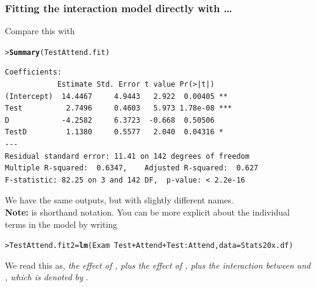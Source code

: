 \documentclass{beamer}\usepackage[]{graphicx}\usepackage[]{xcolor}
\makeatletter
\newcommand{\hlopt}[1]{\textcolor[rgb]{0,0,0}{#1}}%
\newcommand{\hlstd}[1]{\textcolor[rgb]{0.345,0.345,0.345}{#1}}%
\newcommand{\hlkwb}[1]{\textcolor[rgb]{0.69,0.353,0.396}{#1}}%
\newcommand{\hlkwc}[1]{\textcolor[rgb]{0.333,0.667,0.333}{#1}}%
\newcommand{\hlkwd}[1]{\textcolor[rgb]{0.737,0.353,0.396}{\textbf{#1}}}%
\newenvironment{kframe}{%
 \def\at@end@of@kframe{}%
 \ifinner\ifhmode%
  \def\at@end@of@kframe{\end{minipage}}%
  \begin{minipage}{\columnwidth}%
 \fi\fi%
 \def\FrameCommand##1{\hskip\@totalleftmargin \hskip-\fboxsep
 \colorbox{shadecolor}{##1}\hskip-\fboxsep
     \hskip-\linewidth \hskip-\@totalleftmargin \hskip\columnwidth}%
 \MakeFramed {\advance\hsize-\width
   \@totalleftmargin\z@ \linewidth\hsize
   \@setminipage}}%
 {\par\unskip\endMakeFramed%
 \at@end@of@kframe}
\newenvironment{knitrout}{}{} %
\makeatother
\begin{document}
\begin{frame}[fragile]
\frametitle{Fitting the interaction model directly with \dots}
Compare this with
\begin{knitrout}\scriptsize
{}\color{fgcolor}\begin{kframe}
\begin{alltt}
\hlstd{> }\hlkwd{Summary}\hlstd{(TestAttend.fit)}
\end{alltt}
\end{kframe}
\end{knitrout}
\begin{knitrout}\scriptsize
{}\color{fgcolor}\begin{kframe}
\begin{verbatim}
Coefficients:
            Estimate Std. Error t value Pr(>|t|)    
(Intercept)  14.4467     4.9443   2.922  0.00405 ** 
Test          2.7496     0.4603   5.973 1.78e-08 ***
D            -4.2582     6.3723  -0.668  0.50506    
TestD         1.1380     0.5577   2.040  0.04316 *  
---
Residual standard error: 11.41 on 142 degrees of freedom
Multiple R-squared:  0.6347,	Adjusted R-squared:  0.627 
F-statistic: 82.25 on 3 and 142 DF,  p-value: < 2.2e-16
\end{verbatim}
\end{kframe}
\end{knitrout}
\medskip
We have the same outputs, but with slightly different names.\\
\medskip
\textbf{Note:}  is shorthand notation. You can be more explicit about the individual terms in the model by writing \\
\medskip
\begin{knitrout}\scriptsize
{}\color{fgcolor}\begin{kframe}
\begin{alltt}
\hlstd{> }\hlstd{TestAttend.fit2}\hlkwb{=}\hlkwd{lm}\hlstd{(Exam} \hlopt{~}\hlstd{Test} \hlopt{+} \hlstd{Attend} \hlopt{+} \hlstd{Test}\hlopt{:}\hlstd{Attend,} \hlkwc{data}\hlstd{=Stats20x.df)}
\end{alltt}
\end{kframe}
\end{knitrout}
We read this as, \emph{the effect of , plus the effect of , plus the interaction between  and , which is denoted by }.

\end{frame}
\end{document}
